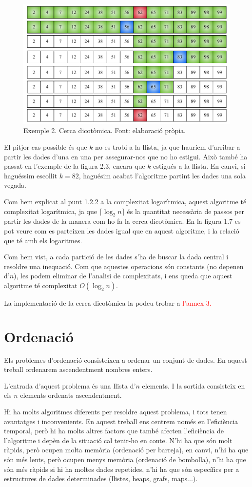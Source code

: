 \begin{figure}[h]
    \centering
    \includegraphics[width=.65\textwidth]{capitols/figures/binary2.pdf}
    \caption[Exemple 2. Cerca dicotòmica.]{Exemple 2. Cerca dicotòmica. Font: elaboració pròpia.}
    \label{fig:my_label}
\end{figure}
El pitjor cas possible és que $k$ no es trobi a la llista, ja que hauríem d'arribar a partir les dades d'una en una per assegurar-nos que no ho estigui. Això també ha passat en l'exemple de la figura 2.3, encara que $k$ estigués a la llista. En canvi, si haguéssim escollit $k = 82$, haguésim acabat l'algoritme partint les dades una sola vegada.

Com hem explicat al punt 1.2.2 a la complexitat logarítmica, aquest algoritme té complexitat logarítmica, ja que $\lceil\log_2{n}\rceil$ és la quantitat necessària de passos per partir les dades de la manera com ho fa la cerca dicotòmica. En la figura 1.7 es pot veure com es parteixen les dades igual que en aquest algoritme, i la relació que té amb els logaritmes.

Com hem vist, a cada partició de les dades s'ha de buscar la dada central i resoldre una inequació. Com que aquestes operacions són constants (no depenen d'$n$), les podem eliminar de l'analisi de complexitats, i ens queda que aquest algoritme té complexitat $O(\log_2{n})$.

La implementació de la cerca dicotòmica la podeu trobar a \textcolor{red}{l'annex 3.}

\section{Ordenació}
Els problemes d'ordenació consisteixen a ordenar un conjunt de dades. En aquest treball ordenarem ascendentment nombres enters.

L'entrada d'aquest problema és una llista d'$n$ elements. I la sortida consisteix en els $n$ elements ordenats ascendentment.

Hi ha molts algoritmes diferents per resoldre aquest problema, i tots tenen avantatges i inconvenients. En aquest treball ens centrem només en l'eficiència temporal, però hi ha molts altres factors que també afecten l'eficiència de l'algoritme i depèn de la situació cal tenir-ho en conte. N'hi ha que són molt ràpids, però ocupen molta memòria (ordenació per barreja), en canvi, n'hi ha que són més lents, però ocupen menys memòria (ordenació de bombolla), n'hi ha que són més ràpids si hi ha moltes dades repetides, n'hi ha que són específics per a estructures de dades determinades (llistes, heaps, grafs, maps...).

